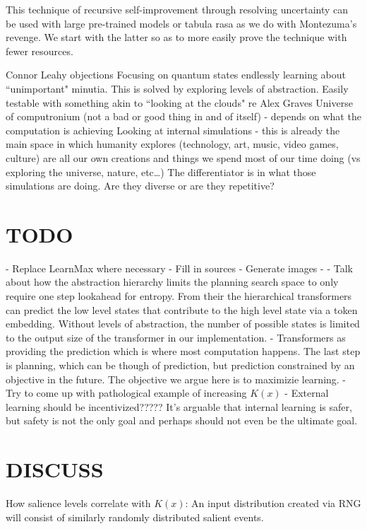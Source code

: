 \documentclass{article}
\begin{document}
This technique of recursive self-improvement through
resolving uncertainty can be used with large pre-trained models
or tabula rasa as we do with Montezuma's revenge. We start
with the latter so as to more easily prove the technique
with fewer resources.


Connor Leahy objections
Focusing on quantum states endlessly learning about \textquotedblleft unimportant" minutia. This is solved by exploring levels of abstraction. Easily testable with something akin to \textquotedblleft looking at the clouds" re Alex Graves
Universe of computronium (not a bad or good thing in and of itself) - depends on what the computation is achieving
Looking at internal simulations - this is already the main space in which humanity explores (technology, art, music, video games, culture) are all our own creations and things we spend most of our time doing (vs exploring the universe, nature, etc…) The differentiator is in what those simulations are doing. Are they diverse or are they repetitive?


\section{TODO}

- Replace LearnMax where necessary
- Fill in sources
- Generate images
-
- Talk about how the abstraction hierarchy limits the planning search space to only require one step lookahead for entropy. From their the hierarchical transformers can predict the low level states that contribute to the high level state via a token embedding. Without levels of abstraction, the number of possible states is limited to the output size of the transformer in our implementation.
- Transformers as providing the prediction which is where most computation happens. The last step is planning, which can be though of prediction, but prediction constrained by an objective in the future. The objective we argue here is to maximizie learning.
- Try to come up with pathological example of increasing $K(x)$
- External learning should be incentivized????? It's arguable that internal learning is safer, but safety is not the only goal and perhaps should not even be the ultimate goal.

\section{DISCUSS}
How salience levels correlate with $K(x)$: An input distribution created via RNG will consist of similarly randomly distributed salient events.
\end{document}
